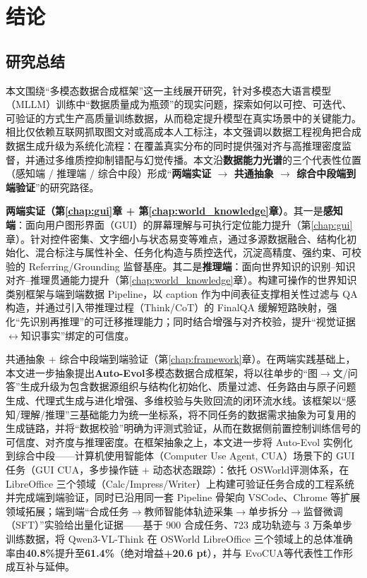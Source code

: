 \chapter{结论}

\section{研究总结}
本文围绕“多模态数据合成框架”这一主线展开研究，针对多模态大语言模型（MLLM）训练中“数据质量成为瓶颈”的现实问题，探索如何以可控、可迭代、可验证的方式生产高质量训练数据，从而稳定提升模型在真实场景中的关键能力。相比仅依赖互联网抓取图文对或高成本人工标注，本文强调以数据工程视角把合成数据生成升级为系统化流程：在覆盖真实分布的同时提供强对齐与高推理密度监督，并通过多维质控抑制错配与幻觉传播。本文沿\textbf{数据能力光谱}的三个代表性位置（感知端 / 推理端 / 综合中段）形成“\textbf{两端实证 $\rightarrow$ 共通抽象 $\rightarrow$ 综合中段端到端验证}”的研究路径。

\textbf{两端实证（第\ref{chap:gui}章 + 第\ref{chap:world_knowledge}章）}。其一是\textbf{感知端}：面向用户图形界面（GUI）的屏幕理解与可执行定位能力提升（第\ref{chap:gui}章）。针对控件密集、文字细小与状态易变等难点，通过多源数据融合、结构化初始化、混合标注与属性补全、任务化构造与质控迭代，沉淀高精度、强约束、可校验的 Referring/\allowbreak Grounding 监督基座。其二是\textbf{推理端}：面向世界知识的识别--知识对齐--推理贯通能力提升（第\ref{chap:world_knowledge}章）。构建可操作的世界知识类别框架与端到端数据 Pipeline，以 caption 作为中间表征支撑相关性过滤与 QA 构造，并通过引入带推理过程（Think/CoT）的 FinalQA 缓解短路映射，强化“先识别再推理”的可迁移推理能力；同时结合增强与对齐校验，提升“视觉证据$\leftrightarrow$知识事实”绑定的可信度。

共通抽象 + 综合中段端到端验证（第\ref{chap:framework}章）。在两端实践基础上，本文进一步抽象提出\textbf{Auto-Evol}多模态数据合成框架，将以往单步的“图$\rightarrow$文/问答”生成升级为包含数据源组织与结构化初始化、质量过滤、任务路由与原子问题生成、代理式生成与进化增强、多维校验与失败回流的闭环流水线。该框架以“感知/理解/推理”三基础能力为统一坐标系，将不同任务的数据需求抽象为可复用的生成链路，并将“数据校验”明确为评测式验证，从而在数据侧前置控制训练信号的可信度、对齐度与推理密度。在框架抽象之上，本文进一步将 Auto-Evol 实例化到综合中段——计算机使用智能体（Computer Use Agent, CUA）场景下的 GUI 任务（GUI CUA，多步操作链 + 动态状态跟踪）：依托 OSWorld\citep{xie2024osworld}评测体系，在 LibreOffice 三个领域（Calc/\allowbreak Impress/\allowbreak Writer）上构建可验证任务合成的工程系统并完成端到端验证，同时已沿用同一套 Pipeline 骨架向 VSCode、Chrome 等扩展领域拓展；端到端“合成任务$\rightarrow$教师智能体轨迹采集$\rightarrow$单步拆分$\rightarrow$监督微调（SFT）”实验给出量化证据——基于 900 合成任务、723 成功轨迹与 3 万条单步训练数据，将 Qwen3-VL-Think 在 OSWorld LibreOffice 三个领域上的总体准确率由\textbf{40.8\%}提升至\textbf{61.4\%}（绝对增益\textbf{+20.6 pt}），并与 EvoCUA\citep{xue2026evocua}等代表性工作形成互补与延伸。

